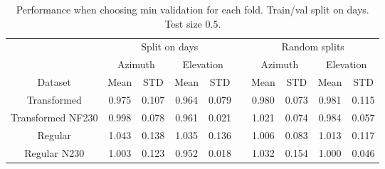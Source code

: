 \begin{table}[!htbp]
    \centering
    \caption{Performance when choosing min validation for each fold. Train/val split on days. Test size $0.5$.}
    \begin{tabular}{ccccc c cccc}
        \toprule
        \multicolumn{1}{c}{} & \multicolumn{4}{c}{Split on days} & & \multicolumn{4}{c}{Random splits} \\
        \cmidrule(lr){2-5} \cmidrule(lr){7-10}
        \multicolumn{1}{c}{} & \multicolumn{2}{c}{Azimuth} & \multicolumn{2}{c}{Elevation} & & \multicolumn{2}{c}{Azimuth} & \multicolumn{2}{c}{Elevation} \\ 
        \cmidrule(lr){2-5} \cmidrule(lr){7-10}
        Dataset &  Mean &  STD &  Mean &  STD & & Mean &  STD &  Mean &  STD \\
        \midrule
        Transformed       &    0.975 &     0.107 &     0.964 &     0.079 &  &   0.980 &     0.073 &     0.981 &     0.115 \\
        Transformed NF230 &    0.998 &     0.078 &     0.961 &     0.021 &  &   1.021 &     0.074 &     0.984 &     0.057 \\
        Regular           &    1.043 &     0.138 &     1.035 &     0.136 &  &   1.006 &     0.083 &     1.013 &     0.117 \\
        Regular N230      &    1.003 &     0.123 &     0.952 &     0.018 &  &   1.032 &     0.154 &     1.000 &     0.046 \\
        \bottomrule
    \end{tabular}  
\end{table}



